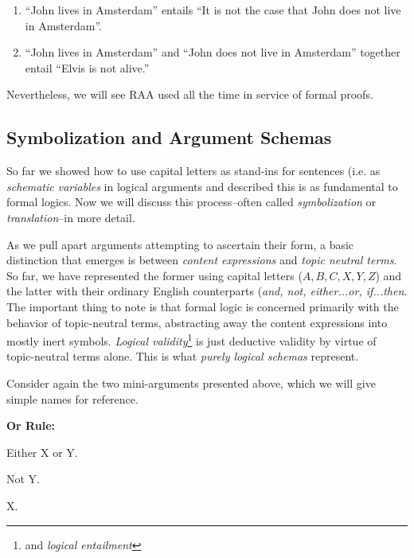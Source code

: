 \begin{enumerate}
\item ``John lives in Amsterdam'' entails ``It is not the case that John
does not live in Amsterdam''.
\item ``John lives in Amsterdam'' and ``John does not live in Amsterdam''
  together entail ``Elvis is not alive.''
\end{enumerate}

Nevertheless, we will see RAA used all the time in service of formal proofs.

\subsection{Symbolization and Argument Schemas}

So far we showed how to use capital letters as stand-ins for sentences (i.e.
as \emph{schematic variables} in logical arguments and described this is as
fundamental to formal logics. Now we will discuss this process--often called
\emph{symbolization} or \emph{translation}--in more detail.

As we pull apart arguments attempting to ascertain their form, a basic
distinction that emerges is between \emph{content expressions} and \emph{topic
neutral terms}. So far, we have represented the former using capital letters
($A, B, C, X, Y, Z$) and the latter with their ordinary English counterparts
(\emph{and, not, either...or, if...then}. The important thing to note is that
formal logic is concerned primarily with the behavior of topic-neutral terms,
abstracting away the content expressions into mostly inert symbols.
\emph{Logical validity}\footnote{and \emph{logical entailment}} is just
deductive validity by virtue of topic-neutral terms alone. This is what
\emph{purely logical schemas} represent.

Consider again the two mini-arguments presented above, which we will give simple
names for reference.

 {
  \begin{argument}
  \item[] \textbf{Or Rule:}
  \item[] Either X or Y.
  \item[] Not Y.
  \item[\therefore] X.
  \end{argument}
}

